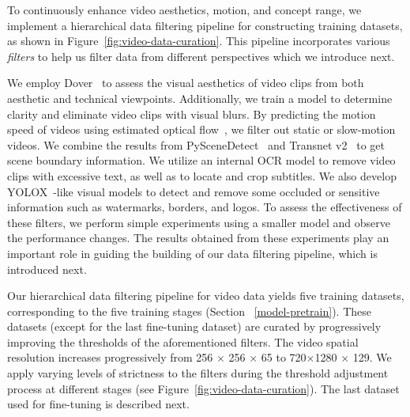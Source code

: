 To continuously enhance video aesthetics, motion, and concept range, we implement a hierarchical data filtering pipeline for constructing training datasets, as shown in Figure~\ref{fig:video-data-curation}. This pipeline incorporates various \textit{filters} to help us filter data from different perspectives which we introduce next. 

We employ Dover~\cite{wu2023exploring} to assess the visual aesthetics of video clips from both aesthetic and technical viewpoints. Additionally, we train a model to determine clarity and eliminate video clips with visual blurs. By predicting the motion speed of videos using estimated optical flow~\cite{opencv}, we filter out static or slow-motion videos. We combine the results from PySceneDetect~\cite{pyscene} and Transnet v2~\cite{souvcek2020transnet} to get scene boundary information. We utilize an internal OCR model to remove video clips with excessive text, as well as to locate and crop subtitles. We also develop YOLOX~\cite{ge2021yolox}-like visual models to detect and remove some occluded or sensitive information such as watermarks, borders, and logos. To assess the effectiveness of these filters, we perform simple experiments using a smaller \nameofmethod{} model and observe the performance changes. The results obtained from these experiments play an important role in guiding the building of our data filtering pipeline, which is introduced next.

Our hierarchical data filtering pipeline for video data yields five training datasets, corresponding to the five training stages (Section ~\ref{model-pretrain}). These datasets (except for the last fine-tuning dataset) are curated by progressively improving the thresholds of the aforementioned filters. The video spatial resolution increases progressively from 256 $\times$ 256 $\times$ 65 to 720$\times$1280 $\times$ 129.
%
%
We apply varying levels of strictness to the filters during the threshold adjustment process at different stages (see Figure~\ref{fig:video-data-curation}). The last dataset used for fine-tuning is described next. 

